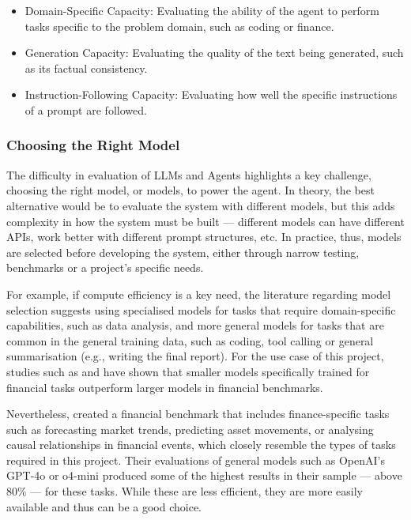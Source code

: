 \documentclass[a4paper]{report}
\begin{document}
\begin{itemize}
    \item Domain-Specific Capacity: Evaluating the ability of the agent to perform tasks specific to the problem domain, such as coding or finance.
    \item Generation Capacity: Evaluating the quality of the text being generated, such as its factual consistency.
    \item Instruction-Following Capacity: Evaluating how well the specific instructions of a prompt are followed.
\end{itemize}

\subsubsection{Choosing the Right Model}

The difficulty in evaluation of LLMs and Agents highlights a key challenge, choosing the right model, or models, to power the agent. In theory, the best alternative would be to evaluate the system with different models, but this adds complexity in how the system must be built --- different models can have different APIs, work better with different prompt structures, etc. In practice, thus, models are selected before developing the system, either through narrow testing, benchmarks or a project's specific needs.

For example, if compute efficiency is a key need, the literature regarding model selection suggests using specialised models for tasks that require domain-specific capabilities, such as data analysis, and more general models for tasks that are common in the general training data, such as coding, tool calling or general summarisation (e.g., writing the final report). For the use case of this project, studies such as \cite{ke2025demystifyingdomainadaptiveposttrainingfinancial} and \cite{tanabe2024enhancingfinancialdomainadaptation} have shown that smaller models specifically trained for financial tasks outperform larger models in financial benchmarks.

Nevertheless, \cite{lu2025bizfinbench} created a financial benchmark that includes finance-specific tasks such as forecasting market trends, predicting asset movements, or analysing causal relationships in financial events, which closely resemble the types of tasks required in this project. Their evaluations of general models such as OpenAI's GPT-4o or o4-mini produced some of the highest results in their sample --- above 80\% --- for these tasks. While these are less efficient, they are more easily available and thus can be a good choice.
\end{document}
